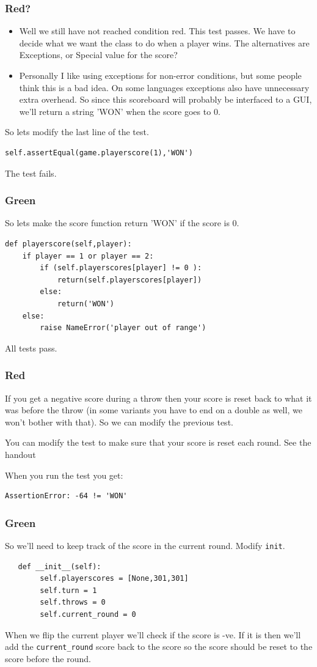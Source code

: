 \documentclass{beamer}
\begin{document}
\begin{frame}
\frametitle{Red?}
\begin{itemize}
\item Well we still have not reached condition red. This test passes. We
have to decide what we want the class to do when a player wins. 
The alternatives are  Exceptions, or  Special value for the score?
\item Personally I like using exceptions for non-error conditions, but some
people think this is a bad idea. On some languages exceptions also
have unnecessary extra overhead. So since this scoreboard will
probably be interfaced to a GUI, we'll return a string 'WON' when the
score goes to 0.
\end{itemize}
\end{frame}
\begin{frame}[fragile]
So lets modify the last line of the test.
\begin{lstlisting}
self.assertEqual(game.playerscore(1),'WON')  
\end{lstlisting}

The test fails. 
\end{frame}
\begin{frame}[fragile]
\frametitle{Green}
So lets make the score function return 'WON' if the score is 0.
\begin{lstlisting}
def playerscore(self,player):
    if player == 1 or player == 2:
        if (self.playerscores[player] != 0 ): 
            return(self.playerscores[player])
        else:
            return('WON')
    else:
        raise NameError('player out of range')
 \end{lstlisting}
All tests pass.
  
\end{frame}
\begin{frame}[fragile]
\frametitle{Red}
If you get a negative score during a throw then your score is reset
back to what it was before the throw (in some variants you have to end
on a double as well, we won't bother with that).  So we can modify the
previous test.

You can modify the test to make sure that your score is reset each
round. See the handout

When you run the test you get:
\begin{verbatim}
AssertionError: -64 != 'WON'
\end{verbatim}
  
\end{frame}
\begin{frame}[fragile]
\frametitle{Green}
So we'll need to keep track of the score in the current round.
Modify {\tt init}.
\begin{lstlisting}
   def __init__(self):
        self.playerscores = [None,301,301]
        self.turn = 1
        self.throws = 0
        self.current_round = 0
\end{lstlisting}
When we flip the current player we'll check if the score is -ve. If it
is then we'll add the {\tt current\_round} score back to the score so the
score should be reset to the score before the round.
  
\end{frame}
\end{document}
